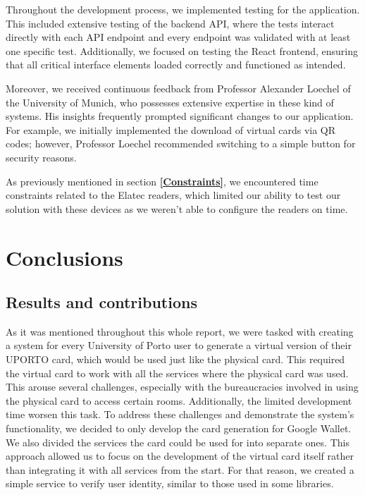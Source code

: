 \documentclass[12pt]{article}
\begin{document}
Throughout the development process, we implemented testing for the application. This
included extensive testing of the backend API, where the tests interact directly with
each API endpoint and every endpoint was validated with at least one specific test.
Additionally, we focused on testing the React frontend, ensuring that all critical
interface elements loaded correctly and functioned as intended.

Moreover, we received continuous feedback from Professor Alexander Loechel of the
University of Munich, who possesses extensive expertise in these kind of systems.
His insights frequently prompted significant changes to our application. For example,
we initially implemented the download of virtual cards via QR codes; however, Professor
Loechel recommended switching to a simple button for security reasons.

As previously mentioned in section \textbf{\ref{Constraints}}, we encountered time constraints related
to the Elatec readers, which limited our ability to test our solution with these
devices as we weren't able to configure the readers on time.

\section{Conclusions}

\subsection{Results and contributions}

As it was mentioned throughout this whole report, we were tasked with creating a system for every University of Porto user to generate a
virtual version of their UPORTO card, which would be used just like the physical card. This required the
virtual card to work with all the services where the physical card was used. This arouse several challenges,
especially with the bureaucracies involved in using the physical card to access certain rooms.
Additionally, the limited development time worsen this task. To address these challenges and
demonstrate the system's functionality, we decided to only develop the card generation for Google Wallet.
We also divided the services the card could be used for into separate ones. This approach allowed
us to focus on the development of the virtual card itself rather than integrating it with all services from the
start. For that reason, we created a simple service to verify user identity, similar to those used in some libraries.
\end{document}
